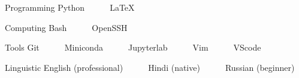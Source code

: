 
\begin{cvskills}


  \cvskill
    {Programming} %
    {Python~~~\bullet~~~LaTeX~~~} %
 
  \cvskill
    {Computing} %
    {Bash~~~\bullet~~~OpenSSH} %
   



  \cvskill
    {Tools} %
    {Git~~~\bullet~~~Miniconda~~~\bullet~~~Jupyterlab~~~\bullet~~~Vim~~~\bullet~~~VScode} %

  \cvskill
    {Linguistic} %
    {English (professional)~~~\bullet~~~Hindi (native)~~~\bullet~~~Russian (beginner)} %



\end{cvskills}